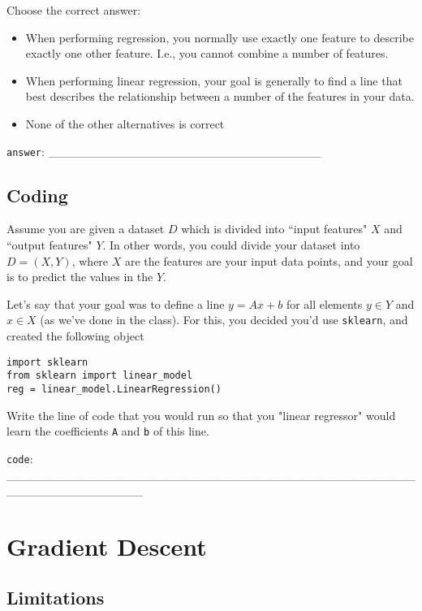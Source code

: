 \documentclass[a4paper,11pt]{scrartcl}
\begin{document}
Choose the correct answer:

\begin{itemize}
\singlespacing
\item When performing regression, you normally use exactly one feature to
      describe exactly one other feature. I.e., you cannot combine a number of
      features.
\item When performing linear regression, your goal is generally to find a line
      that best describes the relationship between a number of the features in
      your data.
\item None of the other alternatives is correct
\end{itemize}

\verb|answer|: \_\_\_\_\_\_\_\_\_\_\_\_\_\_\_\_\_\_\_\_\_\_\_\_\_\_\_\_\_\_\_\_


\subsection{Coding}


Assume you are given a dataset $D$ which is divided into ``input features" $X$
and ``output features" $Y$. In other words, you could divide your dataset into
$D = (X, Y)$, where $X$ are the features are your input data points, and your
goal is to predict the values in the $Y$.

Let's say that your goal was to define a line $y=Ax+b$ for all elements
$y \in Y$ and $x \in X$ (as we've done in the class). For this, you decided
you'd use \verb|sklearn|, and created the following object

{\singlespacing
\begin{verbatim}
import sklearn
from sklearn import linear_model
reg = linear_model.LinearRegression()
\end{verbatim}
}

Write the line of code that you would run so that you "linear regressor" would
learn the coefficients \verb|A| and \verb|b| of this line.

\verb|code|: \_\_\_\_\_\_\_\_\_\_\_\_\_\_\_\_\_\_\_\_\_\_\_\_\_\_\_\_\_\_\_\_\_\_\_\_\_\_\_\_\_\_\_\_\_\_\_\_\_\_\_\_\_\_\_\_\_\_\_\_\_\_\_\_


\section{Gradient Descent}

\subsection{Limitations}
\end{document}
